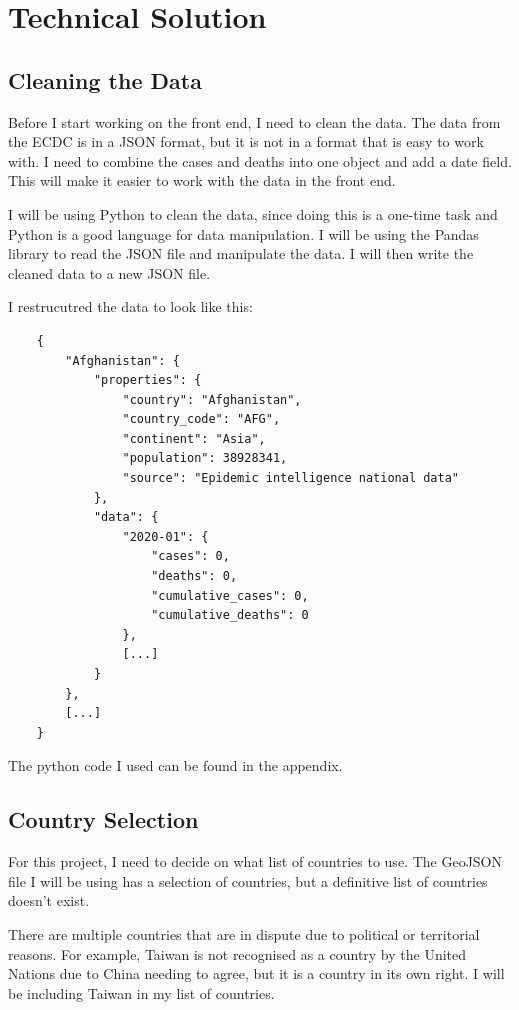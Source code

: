 \documentclass{report}
\begin{document}
\chapter{Technical Solution}
\section{Cleaning the Data}
Before I start working on the front end, I need to clean the data. The data from the ECDC is in a JSON format, but it is not in a format that is easy to work with. I need to combine the cases and deaths into one object and add a date field. This will make it easier to work with the data in the front end.

I will be using Python to clean the data, since doing this is a one-time task and Python is a good language for data manipulation. I will be using the Pandas library to read the JSON file and manipulate the data. I will then write the cleaned data to a new JSON file.

I restrucutred the data to look like this:
\begin{center}
    \begin{lstlisting}
    {
        "Afghanistan": {
            "properties": {
                "country": "Afghanistan",
                "country_code": "AFG",
                "continent": "Asia",
                "population": 38928341,
                "source": "Epidemic intelligence national data"
            },
            "data": {
                "2020-01": {
                    "cases": 0,
                    "deaths": 0,
                    "cumulative_cases": 0,
                    "cumulative_deaths": 0
                },
                [...]
            }
        },
        [...]
    }
    \end{lstlisting}
\end{center}
The python code I used can be found in the appendix.

\section{Country Selection}
For this project, I need to decide on what list of countries to use. The GeoJSON file I will be using has a selection of countries, but a definitive list of countries doesn't exist.

There are multiple countries that are in dispute due to political or territorial reasons. For example, Taiwan is not recognised as a country by the United Nations due to China needing to agree, but it is a country in its own right. I will be including Taiwan in my list of countries.
\end{document}
